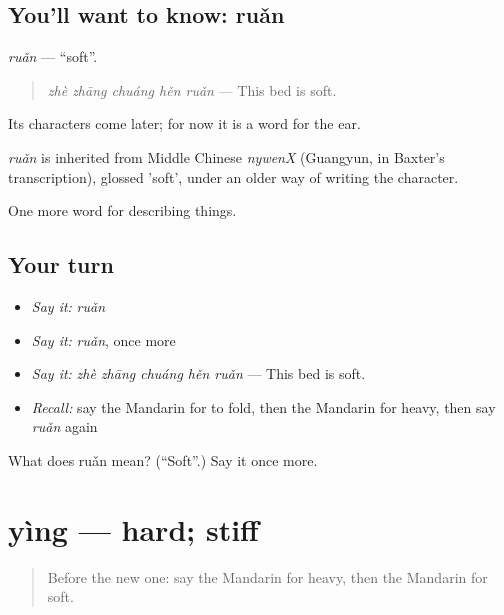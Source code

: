 \subsection*{You'll want to know: ruǎn}
\emph{ruǎn} — \textquotedblleft{}soft\textquotedblright{}.

\begin{quote}
\emph{zhè zhāng chuáng hěn ruǎn} — This bed is soft.
\end{quote}

Its characters come later; for now it is a word for the ear.

\begin{cousinweb}
\emph{ruǎn} is inherited from Middle Chinese \emph{nywenX} (Guangyun, in Baxter's transcription), glossed 'soft', under an older way of writing the character.
\end{cousinweb}

\begin{grammarlens}[title={What you've built}]
One more word for describing things.
\end{grammarlens}

\subsection*{Your turn}
\begin{itemize}
\raggedright
  \item \emph{Say it:} \emph{ruǎn}
  \item \emph{Say it:} \emph{ruǎn}, once more
  \item \emph{Say it:} \emph{zhè zhāng chuáng hěn ruǎn} — This bed is soft.
  \item \emph{Recall:} say the Mandarin for to fold, then the Mandarin for heavy, then say \emph{ruǎn} again
\end{itemize}

\begin{tcolorbox}[breakable,colback=teal!4,colframe=teal!35!black,title={Before you move on}]
What does ruǎn mean? (\textquotedblleft{}Soft\textquotedblright{}.) Say it once more.
\end{tcolorbox}
\section[yìng]{yìng — hard; stiff}

\label{lesson:ZH-C134-ying}



\begin{quote}
Before the new one: say the Mandarin for heavy, then the Mandarin for soft.
\end{quote}

